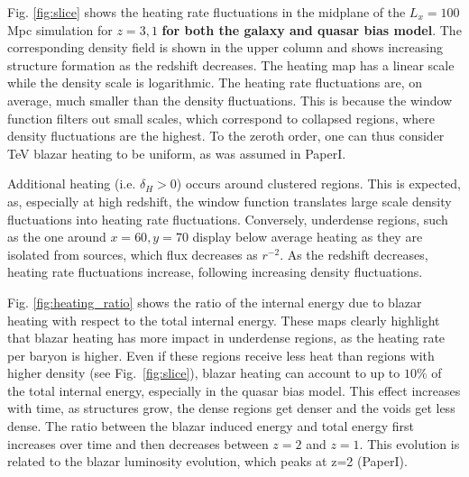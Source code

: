 \documentclass[twocolumns]{emulateapj}
\newcommand\ALc[1]{{\color{red} \bf #1}} %
\begin{document}
Fig. \ref{fig:slice} shows the heating rate fluctuations in the midplane of the $L_x=100$ Mpc simulation for $z=3,1$ \ALc{for both the galaxy and quasar bias model}.  The corresponding density field is shown in the upper column and shows increasing structure formation as the redshift decreases.  The heating map has a linear scale while the density scale is logarithmic. The heating rate fluctuations are, on average, much smaller than the density fluctuations. This is because the window function filters out small scales, which correspond to collapsed regions,  where density fluctuations are the highest. To the zeroth order, one can thus consider TeV blazar heating to be uniform, as was assumed in PaperI.



Additional heating (i.e. $\delta_H>0$) occurs around clustered regions. This is expected, as, especially at high redshift, the window function translates large scale density fluctuations into heating rate fluctuations.  Conversely, underdense regions, such as the one around $x=60,y=70$ display below average heating as they are isolated from sources, which flux decreases as $r^{-2}$. As the redshift decreases, heating rate fluctuations increase, following increasing density fluctuations.

Fig. \ref{fig:heating_ratio} shows the ratio of the internal energy due to  blazar heating with respect to the total internal energy.  These maps clearly highlight that blazar heating has more impact in underdense regions, as the heating rate per baryon is higher. Even if these regions receive less heat than regions with higher density (see Fig.~\ref{fig:slice}), blazar heating can account to up to $10\%$ of the total internal energy, especially in the quasar bias model.  This effect increases with time, as structures grow, the dense regions get denser and the voids get less dense. The ratio between the blazar induced energy and total energy first increases over time and then decreases between $z=2$ and $z=1$.  This evolution is related to the blazar luminosity evolution, which peaks at z=2 (PaperI).
\end{document}
